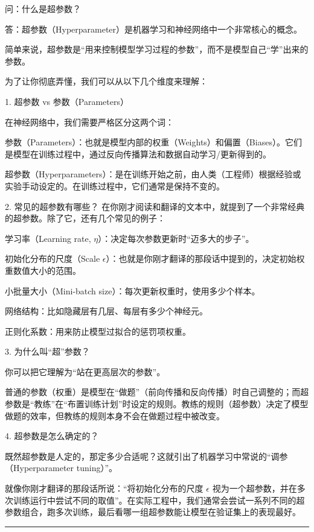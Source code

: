 \documentclass{article}
\begin{document}
{\color{blue}
问：什么是超参数？

答：超参数（Hyperparameter）是机器学习和神经网络中一个非常核心的概念。

简单来说，超参数是“用来控制模型学习过程的参数”，而不是模型自己“学”出来的参数。

为了让你彻底弄懂，我们可以从以下几个维度来理解：

1. 超参数 vs 参数（Parameters）

在神经网络中，我们需要严格区分这两个词：

参数（Parameters）：也就是模型内部的权重（Weights）和偏置（Biases）。它们是模型在训练过程中，通过反向传播算法和数据自动学习/更新得到的。

超参数（Hyperparameters）：是在训练开始之前，由人类（工程师）根据经验或实验手动设定的。在训练过程中，它们通常是保持不变的。

2. 常见的超参数有哪些？
在你刚才阅读和翻译的文本中，就提到了一个非常经典的超参数。除了它，还有几个常见的例子：

学习率（Learning rate, $\eta$）：决定每次参数更新时“迈多大的步子”。

初始化分布的尺度（Scale $\epsilon$）：也就是你刚才翻译的那段话中提到的，决定初始权重数值大小的范围。

小批量大小（Mini-batch size）：每次更新权重时，使用多少个样本。

网络结构：比如隐藏层有几层、每层有多少个神经元。

正则化系数：用来防止模型过拟合的惩罚项权重。

3. 为什么叫“超”参数？

你可以把它理解为“站在更高层次的参数”。

普通的参数（权重）是模型在“做题”（前向传播和反向传播）时自己调整的；而超参数是“教练”在“布置训练计划”时设定的规则。教练的规则（超参数）决定了模型做题的效率，但教练的规则本身不会在做题过程中被改变。

4. 超参数是怎么确定的？

既然超参数是人定的，那定多少合适呢？这就引出了机器学习中常说的“调参（Hyperparameter tuning）”。

就像你刚才翻译的那段话所说：“将初始化分布的尺度 $\epsilon$ 视为一个超参数，并在多次训练运行中尝试不同的取值”。在实际工程中，我们通常会尝试一系列不同的超参数组合，跑多次训练，最后看哪一组超参数能让模型在验证集上的表现最好。

}

\noindent\rule{\linewidth}{0.4pt}
\end{document}
